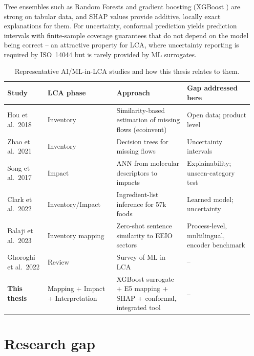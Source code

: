 Tree ensembles such as Random Forests \citep{breiman2001} and gradient boosting (XGBoost
\citep{chen2016xgboost}) are strong on tabular data, and SHAP values \citep{lundberg2017,lundberg2020}
provide additive, locally exact explanations for them. For uncertainty, conformal prediction
\citep{vovk2005,lei2018,angelopoulos2023} yields prediction intervals with finite-sample coverage
guarantees that do not depend on the model being correct -- an attractive property for LCA, where
uncertainty reporting is required by ISO~14044 but is rarely provided by ML surrogates.

\begin{table}[ht]
\centering\small
\caption{Representative AI/ML-in-LCA studies and how this thesis relates to them.}
\label{tab:lit}
\begin{tabularx}{\textwidth}{@{}p{2.6cm}p{2.4cm}Xp{2.3cm}@{}}
\toprule
Study & LCA phase & Approach & Gap addressed here \\
\midrule
Hou et al.\ 2018 \citep{hou2018} & Inventory & Similarity-based estimation of missing flows (ecoinvent) & Open data; product level \\
Zhao et al.\ 2021 \citep{zhao2021} & Inventory & Decision trees for missing flows & Uncertainty intervals \\
Song et al.\ 2017 \citep{song2017} & Impact & ANN from molecular descriptors to impacts & Explainability; unseen-category test \\
Clark et al.\ 2022 \citep{clark2022} & Inventory/Impact & Ingredient-list inference for 57k foods & Learned model; uncertainty \\
Balaji et al.\ 2023 \citep{balaji2023caml} & Inventory mapping & Zero-shot sentence similarity to EEIO sectors & Process-level, multilingual, encoder benchmark \\
Ghoroghi et al.\ 2022 \citep{ghoroghi2022} & Review & Survey of ML in LCA & -- \\
\midrule
\textbf{This thesis} & Mapping + Impact + Interpretation & XGBoost surrogate + E5 mapping + SHAP + conformal, integrated tool & -- \\
\bottomrule
\end{tabularx}
\end{table}

\section{Research gap}

